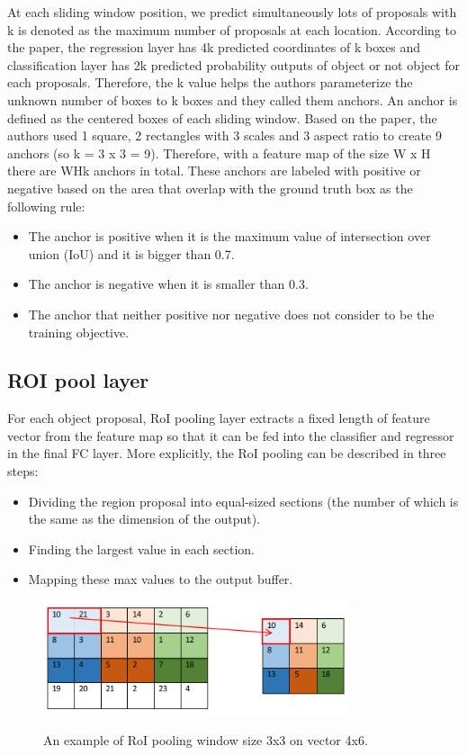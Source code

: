 	At each sliding window position, we predict simultaneously lots of proposals with k is denoted as the maximum number of proposals at each location. According to the paper, the regression layer has 4k predicted coordinates of k boxes and classification layer has 2k predicted probability outputs of object or not object for each proposals. Therefore, the k value helps the authors parameterize the unknown number of boxes to k boxes and they called them anchors. 
	An anchor is defined as the centered boxes of each sliding window. Based on the paper, the authors used 1 square, 2 rectangles with 3 scales and 3 aspect ratio to create 9 anchors (so k = 3 x 3 = 9). Therefore, with a feature map of the size W x H there are WHk anchors in total. These anchors are labeled with positive or negative based on the area that overlap with the ground truth box as the following rule:
	\begin{itemize}
		\item The anchor is positive when it is the maximum value of intersection over union (IoU) and it is bigger than 0.7.
		\item The anchor is negative when it is smaller than 0.3.
		\item The anchor that neither positive nor negative does not consider to be the training objective.
	\end{itemize}
	
\subsection{ROI pool layer}
\label{subsection:roi_pool}
\noindent	
	
	For each object proposal, RoI pooling layer extracts a fixed length of feature vector from the feature map so that it can be fed into the classifier and regressor in the final FC layer. More explicitly, the RoI pooling can be described in three steps:
	\begin{itemize}
		\item Dividing the region proposal into equal-sized sections (the number of which is the same as the dimension of the output).
		\item Finding the largest value in each section.
		\item Mapping these max values to the output buffer.
	\end{itemize}
	
	\begin{figure}[H]
		\centering
		{\includegraphics[width=0.8\textwidth]{./hinhanh/chap4/roi_quantization.png}}
		\caption{An example of RoI pooling window size 3x3 on vector 4x6.}
		\label{fig:roi_quantization}
	\end{figure}
	

